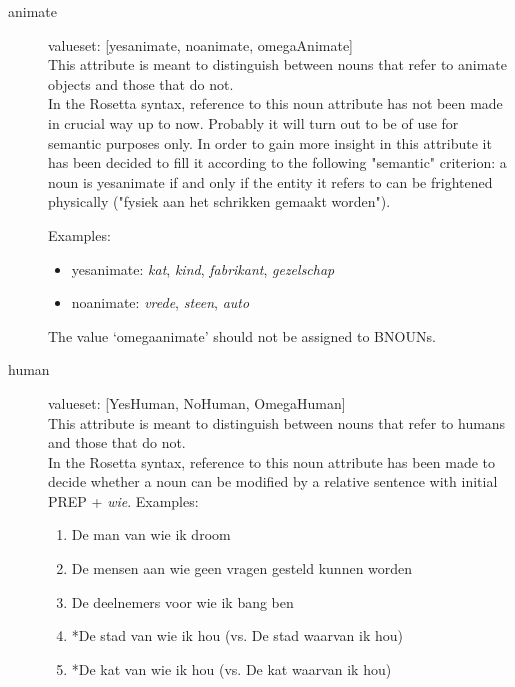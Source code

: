 \begin{description}
\begin{description}
\end{description}

\newpage
\item 
[animate]\mbox{}

valueset: [yesanimate, noanimate, omegaAnimate]\\

This attribute is meant to distinguish between nouns that refer to 
animate objects and those that do not.\\

In the Rosetta syntax,  reference to this noun attribute has not been made 
in  crucial way up to now. Probably it will turn out to be of use for 
semantic purposes only. In order to gain more insight in
this attribute it has been decided to fill it according to the following
"semantic" criterion: a noun is yesanimate if and only if 
the entity it refers to can 
be frightened physically ("fysiek aan het schrikken gemaakt worden").



Examples:
\begin{itemize}
  \item yesanimate: {\em kat}, {\em kind}, {\em fabrikant}, {\em gezelschap}
  \item noanimate: {\em  vrede}, {\em steen}, {\em auto}
\end{itemize}


The value `omegaanimate'  should not be assigned to BNOUNs.\\
\newpage
\item 
[human]\mbox{}

valueset: [YesHuman, NoHuman, OmegaHuman]\\

This attribute is meant to distinguish between nouns that refer to 
humans and those that do not.\\

In the Rosetta syntax, reference to this noun attribute has been made 
to decide whether a noun can be modified by a relative sentence
with initial PREP + {\em wie}. Examples:
\begin{enumerate}
  \item De man van wie ik droom
  \item De mensen aan wie geen vragen gesteld kunnen worden
  \item De deelnemers voor wie ik bang ben
  \item *De stad van wie ik hou (vs. De stad waarvan ik hou)
  \item *De kat van wie ik hou (vs. De kat waarvan ik hou)
\end{enumerate}


\end{description}
